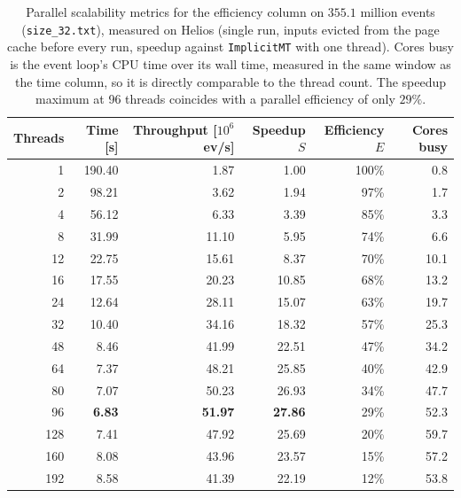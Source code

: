 \begin{table}[htbp]
\centering
\caption{Parallel scalability metrics for the efficiency column on $355.1$ million events (\texttt{size\_32.txt}), measured on Helios (single run, inputs evicted from the page cache before every run, speedup against \texttt{ImplicitMT} with one thread). Cores busy is the event loop's CPU time over its wall time, measured in the same window as the time column, so it is directly comparable to the thread count. The speedup maximum at 96 threads coincides with a parallel efficiency of only $29\%$.}
\label{tab:scalability-efficiency}
\begin{tabular}{rrrrrr}
\toprule
Threads & Time [s] & Throughput [$10^6$ ev/s] & Speedup $S$ & Efficiency $E$ & Cores busy \\
\midrule
 1 & 190.40 & 1.87 & 1.00 & 100\% & 0.8 \\
 2 & 98.21 & 3.62 & 1.94 & 97\% & 1.7 \\
 4 & 56.12 & 6.33 & 3.39 & 85\% & 3.3 \\
 8 & 31.99 & 11.10 & 5.95 & 74\% & 6.6 \\
12 & 22.75 & 15.61 & 8.37 & 70\% & 10.1 \\
16 & 17.55 & 20.23 & 10.85 & 68\% & 13.2 \\
24 & 12.64 & 28.11 & 15.07 & 63\% & 19.7 \\
32 & 10.40 & 34.16 & 18.32 & 57\% & 25.3 \\
48 & 8.46 & 41.99 & 22.51 & 47\% & 34.2 \\
64 & 7.37 & 48.21 & 25.85 & 40\% & 42.9 \\
80 & 7.07 & 50.23 & 26.93 & 34\% & 47.7 \\
96 & \textbf{6.83} & \textbf{51.97} & \textbf{27.86} & 29\% & 52.3 \\
128 & 7.41 & 47.92 & 25.69 & 20\% & 59.7 \\
160 & 8.08 & 43.96 & 23.57 & 15\% & 57.2 \\
192 & 8.58 & 41.39 & 22.19 & 12\% & 53.8 \\
\bottomrule
\end{tabular}
\end{table}
